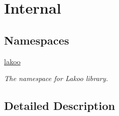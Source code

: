 \hypertarget{group__internal}{}\section{Internal}
\label{group__internal}
\subsection*{Namespaces}
\begin{DoxyCompactItemize}
\item 
 \hyperlink{namespacelakoo}{lakoo}
\begin{DoxyCompactList}\small\item\em The namespace for Lakoo library. \end{DoxyCompactList}\end{DoxyCompactItemize}


\subsection{Detailed Description}
